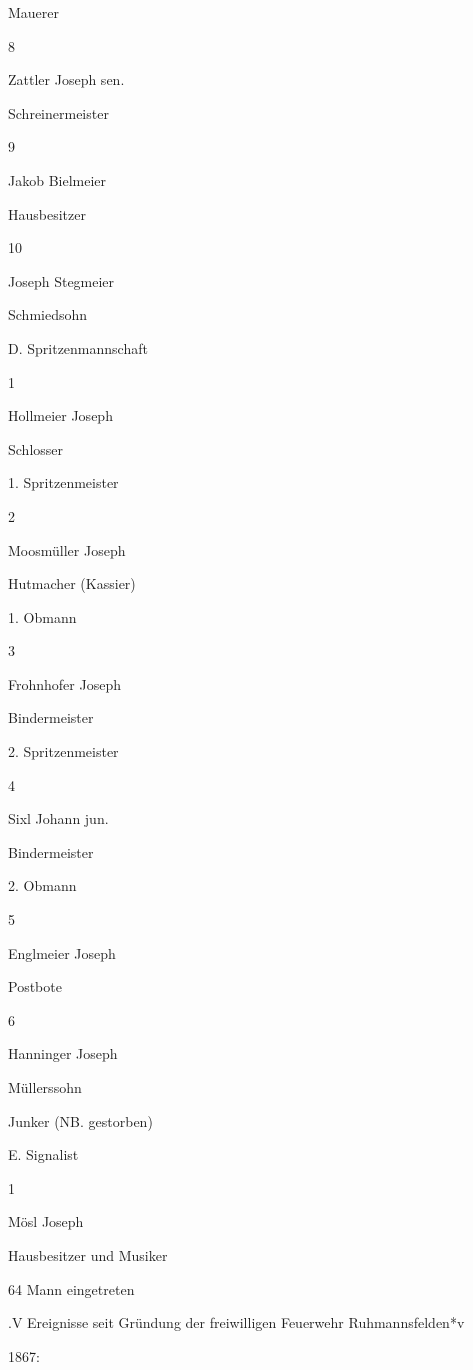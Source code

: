 \documentclass[12pt,a4paper]{book}
\begin{document}
Mauerer



8

Zattler Joseph sen.

Schreinermeister



9

Jakob Bielmeier

Hausbesitzer



10

Joseph Stegmeier

Schmiedsohn





D. Spritzenmannschaft

1

Hollmeier Joseph

Schlosser

1. Spritzenmeister

2

Moosmüller Joseph

Hutmacher (Kassier)

1. Obmann

3

Frohnhofer Joseph

Bindermeister

2. Spritzenmeister

4

Sixl Johann jun.

Bindermeister

2. Obmann

5

Englmeier Joseph

Postbote



6

Hanninger Joseph

Müllerssohn

Junker (NB. gestorben)



E. Signalist

1

Mösl Joseph

Hausbesitzer und Musiker





64 Mann eingetreten

.V Ereignisse seit Gründung der freiwilligen Feuerwehr Ruhmannsfelden*v

1867:
\end{document}
